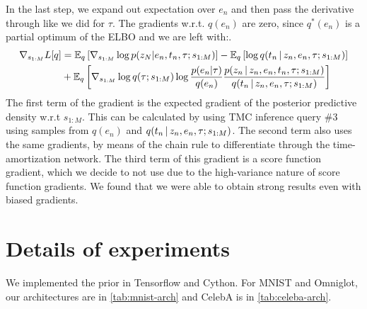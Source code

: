 In the last step, we expand out expectation over $e_n$ and
then pass the derivative through like we did for $\tau$.
The gradients w.r.t. $q(e_n)$ are zero, since $q^*(e_n)$ is
a partial optimum of the ELBO and we are left with:.
\begin{equation}
    \begin{split}
        \nabla_{s_{1:M}}L[q] &= \mathbb{E}_q\left[\nabla_{s_{1:M}}\log p(z_N | e_n, t_n, \tau; s_{1:M})\right] - \mathbb{E}_q\left[\log q(t_n \,|\, z_n, e_n, \tau; s_{1:M})\right] \\
        &+ \mathbb{E}_q\left[\nabla_{s_{1:M}} \log q(\tau; s_{1:M})\log\frac{p(e_n | \tau)}{q(e_n)}\frac{p(z_n \,|\, z_n, e_n, t_n, \tau; s_{1:M})}{q(t_n \,|\, z_n, e_n, \tau; s_{1:M})}\right]
    \end{split}
\end{equation}
The first term of the gradient is the expected gradient
of the posterior predictive density w.r.t $s_{1:M}$.
This can be calculated by using TMC inference query \#3
using samples from $q(e_n)$ and $q(t_n \,|\, z_n, e_n, \tau; s_{1:M})$. The second term also uses the same gradients, by means
of the chain rule to differentiate through the time-amortization network.
The third term of this gradient is a score function gradient,
which we decide to not use due to the high-variance nature of score function gradients. We found that we were able to obtain strong results even with biased gradients.

\section{Details of experiments}
\label{sec:implementation-details}

We implemented the \acronym\;prior in Tensorflow
and Cython. 
For MNIST and Omniglot, our architectures are in \autoref{tab:mnist-arch} and CelebA is in \autoref{tab:celeba-arch}.


